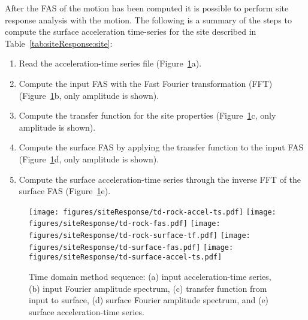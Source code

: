 \documentclass[12pt,oneside]{book}
\begin{document}
After the FAS of the motion has been computed it is possible to perform site response
analysis with the motion.  The following is a summary of the steps to compute the surface
acceleration time-series for the site described in Table~\ref{tab:siteResponse:site}:
\begin{enumerate}
    \item Read the acceleration-time series file (Figure~\ref{fig:siteResponse:timeDomainSequence}a).
    \item Compute the input FAS with the Fast Fourier transformation (FFT)
        (Figure~\ref{fig:siteResponse:timeDomainSequence}b, only amplitude is shown).
    \item Compute the transfer function for the site properties
        (Figure~\ref{fig:siteResponse:timeDomainSequence}c, only amplitude is shown).
    \item Compute the surface FAS by applying the transfer function to the input FAS
        (Figure~\ref{fig:siteResponse:timeDomainSequence}d, only amplitude is shown).
    \item Compute the surface acceleration-time series through the inverse FFT of the surface FAS
        (Figure~\ref{fig:siteResponse:timeDomainSequence}e).
\end{enumerate}

\begin{figure}[p]
    \begin{center}
        \texttt{[image: figures/siteResponse/td-rock-accel-ts.pdf]}
        \texttt{[image: figures/siteResponse/td-rock-fas.pdf]}
        \texttt{[image: figures/siteResponse/td-rock-surface-tf.pdf]}
        \texttt{[image: figures/siteResponse/td-surface-fas.pdf]}
        \texttt{[image: figures/siteResponse/td-surface-accel-ts.pdf]}
    \end{center}
    \caption[Time domain method sequence]{Time domain method sequence: (a) input acceleration-time series, (b) input
        Fourier amplitude spectrum, (c) transfer function from input to surface, (d) surface Fourier
    amplitude spectrum, and (e) surface acceleration-time series.}
    \label{fig:siteResponse:timeDomainSequence}
\end{figure}
\end{document}
